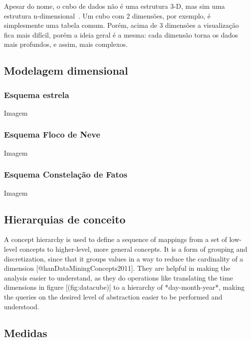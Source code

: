 Apesar do nome, o cubo de dados não é uma estrutura 3-D, mas sim uma estrutura n-dimensional~\cite{hanDataMiningConcepts2011}.
Um cubo com 2 dimensões, por exemplo, é simplesmente uma tabela comum.
Porém, acima de 3 dimensões a visualização fica mais difícil, porém a ideia geral é a mesma: cada dimensão torna os dados mais profundos, e assim, mais complexos.

\cite{hanDataMiningConcepts2011}

\subsection{Modelagem dimensional}

\subsubsection{Esquema estrela}

{\color{red} Imagem}

\subsubsection{Esquema Floco de Neve}

{\color{red} Imagem}

\subsubsection{Esquema Constelação de Fatos}

{\color{red} Imagem}

\subsection{Hierarquias de conceito}

A concept hierarchy is used to define a sequence of mappings from a set of low-level concepts to higher-level, more general concepts.
It is a form of grouping and discretization, since that it groups values in a way to reduce the cardinality of a dimension [@hanDataMiningConcepts2011].
They are helpful in making the analysis easier to understand, as they do operations like translating the time dimensions in figure [\@ref(fig:datacube)] to a hierarchy of *day-month-year*, making the queries on the desired level of abstraction easier to be performed and understood.

\subsection{Medidas}

